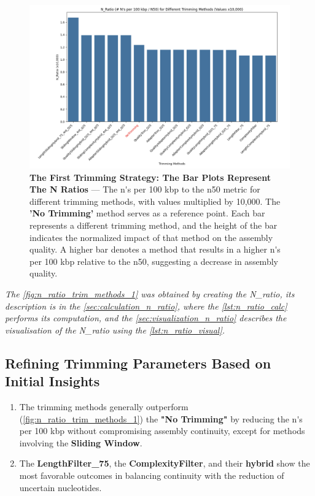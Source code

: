 \begin{figure}[H]
\centering
\includegraphics[width=\linewidth]{resources/images/n_ratio_1.png}
\caption{\textbf{The First Trimming Strategy: The Bar Plots Represent The N Ratios} — The \gls{n's per 100 kbp} to the \gls{n50} metric for different \gls{trimming} methods, with values multiplied by 10,000. The \textbf{'No Trimming'} method serves as a reference point. Each bar represents a different \gls{trimming} method, and the height of the bar indicates the normalized impact of that method on the \gls{assembly} quality. A higher bar denotes a method that results in a higher \gls{n's per 100 kbp} relative to the \gls{n50}, suggesting a decrease in \gls{assembly} quality.}
\label{fig:n_ratio_trim_methods_1}
\end{figure}

\textit{The \autoref{fig:n_ratio_trim_methods_1} was obtained by creating the  N\_ratio, its description is in the  \autoref{sec:calculation_n_ratio}, where the \autoref{lst:n_ratio_calc} performs its computation, and the \autoref{sec:visualization_n_ratio} describes the visualisation of the N\_ratio using the \autoref{lst:n_ratio_visual}.}

\subsection{Refining Trimming Parameters Based on Initial Insights} 

\begin{enumerate}
  \item The \gls{trimming} methods generally outperform (\autoref{fig:n_ratio_trim_methods_1}) the \textbf{"No Trimming"} by reducing the \gls{n's per 100 kbp} without compromising \gls{assembly} continuity, except for methods involving the \textbf{Sliding Window}.
  \item The \textbf{LengthFilter\_75}, the \textbf{ComplexityFilter}, and their \textbf{hybrid} show the most favorable outcomes in balancing continuity with the reduction of uncertain nucleotides.
\end{enumerate}

